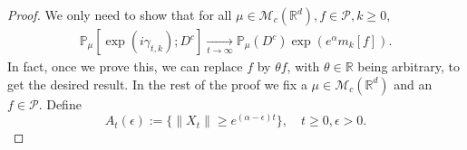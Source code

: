 \documentclass[12pt,a4paper]{amsart}
\theoremstyle{plain}
\theoremstyle{definition}
\numberwithin{equation}{section}
\begin{document}
 \begin{proof}
   We only need to show that for all $\mu \in \mathcal M_c(\mathbb R^d), f\in \mathcal P, k \geq 0$, 
\begin{equation}\begin{split}
    \mathbb{P}_{\mu}[\exp(i\gamma_{t,k}); D^c]
    \xrightarrow[t\rightarrow \infty]{}\mathbb{P}_{\mu}(D^c)\exp(e^{\alpha}m_k[f]).
\end{split}\end{equation}
    In fact, once we prove this, we can replace $f$ by $\theta f$, with $\theta \in \mathbb R$ being  arbitrary,  to get the desired result.
    In the rest of the proof we fix a $\mu \in \mathcal M_c(\mathbb R^d)$ and an $f\in \mathcal P$.
    Define
\[
    A_t(\epsilon):=\{ \|X_t\| \geq e^{(\alpha - \epsilon)t} \},\quad t\geq 0, \epsilon > 0.
\]


\end{proof}
\end{document}

